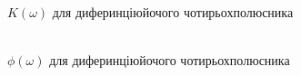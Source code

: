 \begin{figure}[h]
	\begin{minipage}[h]{0.4\linewidth}
		 \\$K(\omega)$ для диферинціюйочого чотирьохполюсника
	\end{minipage}
	\hfill
	\begin{minipage}[h]{0.4\linewidth}
		 \\$\phi(\omega)$ для диферинціюйочого чотирьохполюсника
	\end{minipage}
	\vfill
	\begin{minipage}[h]{0.4\linewidth}

\end{minipage}
\end{figure}
